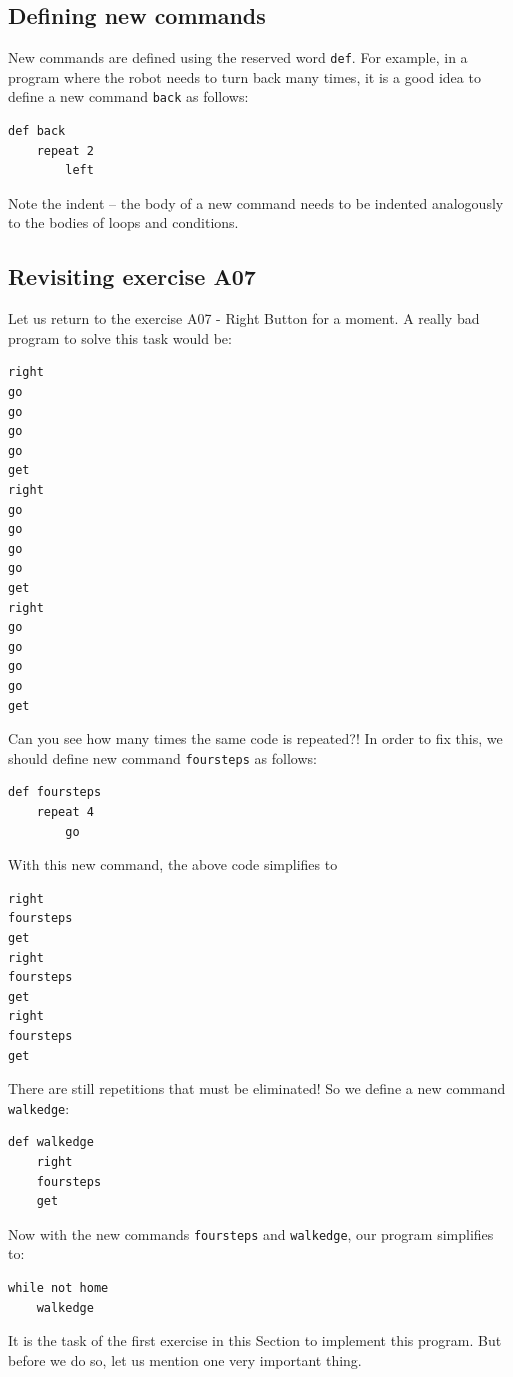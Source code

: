 {{{{\subsection{Defining new commands}

New commands are defined using the reserved word 
{\tt def}. For example, in a program where the robot needs to turn back
many times, it is a good idea to define a new command {\tt back}
as follows:

\begin{verbatim}
def back
    repeat 2
        left
\end{verbatim}
Note the indent -- the body of a new command needs to be indented 
analogously to the bodies of loops and conditions.

\subsection{Revisiting exercise A07}

Let us return to the exercise A07 - Right Button for a moment.
A really bad program to solve this task would be:

{\small
\begin{verbatim}
right
go
go
go
go 
get
right
go
go
go
go 
get
right
go
go
go
go
get
\end{verbatim}
}
\noindent
Can you see how many times the same code is repeated?! In order to fix this, 
we should define new command {\tt foursteps} as
follows:

{\small
\begin{verbatim}
def foursteps
    repeat 4
        go
\end{verbatim}
}
\noindent
With this new command, the above code simplifies to 

{\small
\begin{verbatim}
right
foursteps
get
right
foursteps
get
right
foursteps
get
\end{verbatim}
}
\noindent
There are still repetitions that must be eliminated! So we define a new command 
{\tt walkedge}:

{\small
\begin{verbatim}
def walkedge
    right
    foursteps
    get
\end{verbatim}
}
\noindent
Now with the new commands {\tt foursteps} and
{\tt walkedge}, our program simplifies to:

{\small
\begin{verbatim}
while not home
    walkedge
\end{verbatim}
}
\noindent
It is the task of the first exercise in this Section to implement this program. But before we 
do so, let us mention one very important thing.

}}}}
